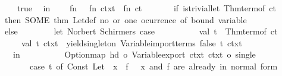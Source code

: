\begin{isabellebody}
\ \ \ \ \ \ {\isacharbar}{\kern0pt}\ {\isacharunderscore}{\kern0pt}\ {\isacharequal}{\kern0pt}{\isachargreater}{\kern0pt}\ true{\isacharparenright}{\kern0pt}{\isacharsemicolon}{\kern0pt}\isanewline
\ \ in\isanewline
\ \ \ \ fn\ {\isacharunderscore}{\kern0pt}\ {\isacharequal}{\kern0pt}{\isachargreater}{\kern0pt}\ fn\ ctxt\ {\isacharequal}{\kern0pt}{\isachargreater}{\kern0pt}\ fn\ ct\ {\isacharequal}{\kern0pt}{\isachargreater}{\kern0pt}\isanewline
\ \ \ \ \ \ if\ is{\isacharunderscore}{\kern0pt}trivial{\isacharunderscore}{\kern0pt}let\ {\isacharparenleft}{\kern0pt}Thm{\isachardot}{\kern0pt}term{\isacharunderscore}{\kern0pt}of\ ct{\isacharparenright}{\kern0pt}\isanewline
\ \ \ \ \ \ then\ SOME\ {\isacharat}{\kern0pt}{\isacharbraceleft}{\kern0pt}thm\ Let{\isacharunderscore}{\kern0pt}def{\isacharbraceright}{\kern0pt}\ {\isacharparenleft}{\kern0pt}{\isacharasterisk}{\kern0pt}no\ or\ one\ ocurrence\ of\ bound\ variable{\isacharasterisk}{\kern0pt}{\isacharparenright}{\kern0pt}\isanewline
\ \ \ \ \ \ else\isanewline
\ \ \ \ \ \ \ \ let\ {\isacharparenleft}{\kern0pt}{\isacharasterisk}{\kern0pt}Norbert\ Schirmer{\isacharprime}{\kern0pt}s\ case{\isacharasterisk}{\kern0pt}{\isacharparenright}{\kern0pt}\isanewline
\ \ \ \ \ \ \ \ \ \ val\ t\ {\isacharequal}{\kern0pt}\ Thm{\isachardot}{\kern0pt}term{\isacharunderscore}{\kern0pt}of\ ct{\isacharsemicolon}{\kern0pt}\isanewline
\ \ \ \ \ \ \ \ \ \ val\ {\isacharparenleft}{\kern0pt}t{\isacharprime}{\kern0pt}{\isacharcomma}{\kern0pt}\ ctxt{\isacharprime}{\kern0pt}{\isacharparenright}{\kern0pt}\ {\isacharequal}{\kern0pt}\ yield{\isacharunderscore}{\kern0pt}singleton\ {\isacharparenleft}{\kern0pt}Variable{\isachardot}{\kern0pt}import{\isacharunderscore}{\kern0pt}terms\ false{\isacharparenright}{\kern0pt}\ t\ ctxt{\isacharsemicolon}{\kern0pt}\isanewline
\ \ \ \ \ \ \ \ in\isanewline
\ \ \ \ \ \ \ \ \ \ Option{\isachardot}{\kern0pt}map\ {\isacharparenleft}{\kern0pt}hd\ o\ Variable{\isachardot}{\kern0pt}export\ ctxt{\isacharprime}{\kern0pt}\ ctxt\ o\ single{\isacharparenright}{\kern0pt}\isanewline
\ \ \ \ \ \ \ \ \ \ \ \ {\isacharparenleft}{\kern0pt}case\ t{\isacharprime}{\kern0pt}\ of\ Const\ {\isacharparenleft}{\kern0pt}\isactrlconstUNDERSCOREname {\isasymopen}Let{\isasymclose}{\isacharcomma}{\kern0pt}{\isacharunderscore}{\kern0pt}{\isacharparenright}{\kern0pt}\ {\isachardollar}{\kern0pt}\ x\ {\isachardollar}{\kern0pt}\ f\ {\isacharequal}{\kern0pt}{\isachargreater}{\kern0pt}\ {\isacharparenleft}{\kern0pt}{\isacharasterisk}{\kern0pt}\ x\ and\ f\ are\ already\ in\ normal\ form\ {\isacharasterisk}{\kern0pt}{\isacharparenright}{\kern0pt}\isanewline

\end{isabellebody}
